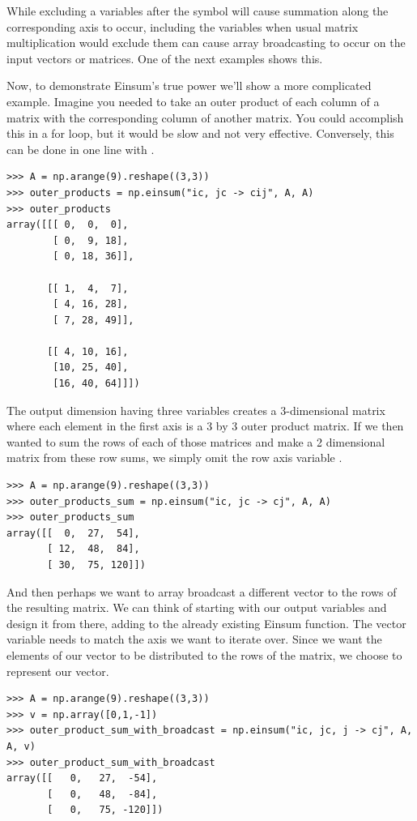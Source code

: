\begin{info}
While excluding a variables after the \li{->} symbol will cause summation along the corresponding axis to occur,  including the variables when usual matrix multiplication would exclude them can cause array broadcasting to occur on the input vectors or matrices. One of the next examples shows this.
\end{info}

Now, to demonstrate Einsum's true power we'll show a more complicated example. Imagine you needed to take an outer product of each column of a matrix with the corresponding column of another matrix. You could accomplish this in a for loop, but it would be slow and not very effective. Conversely, this can be done in one line with .

\begin{lstlisting}
>>> A = np.arange(9).reshape((3,3))
>>> outer_products = np.einsum("ic, jc -> cij", A, A)
>>> outer_products
array([[[ 0,  0,  0],
        [ 0,  9, 18],
        [ 0, 18, 36]],

       [[ 1,  4,  7],
        [ 4, 16, 28],
        [ 7, 28, 49]],

       [[ 4, 10, 16],
        [10, 25, 40],
        [16, 40, 64]]])
\end{lstlisting} 

The output dimension having three variables creates a 3-dimensional matrix where each element in the first axis is a 3 by 3 outer product matrix. If we then wanted to sum the rows of each of those matrices and make a 2 dimensional matrix from these row sums, we simply omit the row axis variable .

\begin{lstlisting}
>>> A = np.arange(9).reshape((3,3))
>>> outer_products_sum = np.einsum("ic, jc -> cj", A, A)
>>> outer_products_sum
array([[  0,  27,  54],
       [ 12,  48,  84],
       [ 30,  75, 120]])
\end{lstlisting}

And then perhaps we want to array broadcast a different vector to the rows of the resulting matrix. We can think of starting with our output variables  and design it from there, adding to the already existing Einsum function. The vector variable needs to match the axis we want to iterate over. Since we want the elements of our vector to be distributed to the rows of the matrix, we choose  to represent our vector.

\begin{lstlisting}
>>> A = np.arange(9).reshape((3,3))
>>> v = np.array([0,1,-1])
>>> outer_product_sum_with_broadcast = np.einsum("ic, jc, j -> cj", A, A, v)
>>> outer_product_sum_with_broadcast
array([[   0,   27,  -54],
       [   0,   48,  -84],
       [   0,   75, -120]])
\end{lstlisting}

